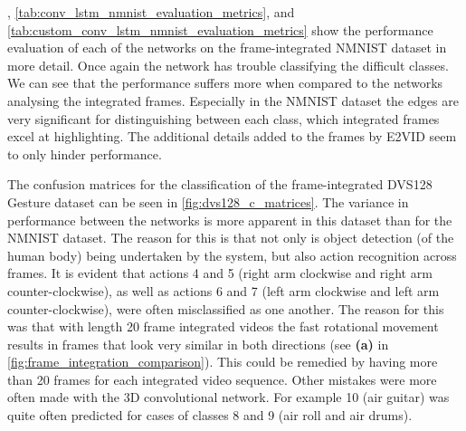 , \cref{tab:conv_lstm_nmnist_evaluation_metrics}, and \cref{tab:custom_conv_lstm_nmnist_evaluation_metrics} show the performance evaluation of each of the networks on the frame-integrated NMNIST dataset in more detail. Once again the network has trouble classifying the difficult classes. We can see that the performance suffers more when compared to the networks analysing the integrated frames. Especially in the NMNIST dataset the edges are very significant for distinguishing between each class, which integrated frames excel at highlighting. The additional details added to the frames by E2VID seem to only hinder performance.

\vspace{10pt}

The confusion matrices for the classification of the frame-integrated DVS128 Gesture dataset can be seen in \cref{fig:dvs128_c_matrices}. The variance in performance between the networks is more apparent in this dataset than for the NMNIST dataset. The reason for this is that not only is object detection (of the human body) being undertaken by the system, but also action recognition across frames. It is evident that actions 4 and 5 (right arm clockwise and right arm counter-clockwise), as well as actions 6 and 7 (left arm clockwise and left arm counter-clockwise), were often misclassified as one another. The reason for this was that with length 20 frame integrated videos the fast rotational movement results in frames that look very similar in both directions (see \textbf{(a)} in \cref{fig:frame_integration_comparison}). This could be remedied by having more than 20 frames for each integrated video sequence. Other mistakes were more often made with the 3D convolutional network. For example 10 (air guitar) was quite often predicted for cases of classes 8 and 9 (air roll and air drums). 

